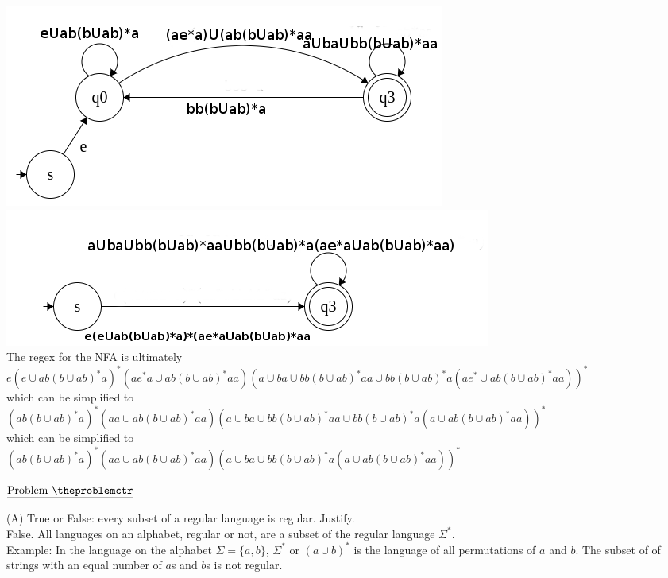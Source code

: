 \documentclass[11pt]{article}
\def\pp{\par\noindent}
\begin{document}
\includegraphics[scale=0.5]{4d.png}\\
\includegraphics[scale=0.5]{4e.png}\\
The regex for the NFA is ultimately \\$e(e\cup ab(b \cup ab)^*a)^*(ae^*a\cup ab(b \cup ab)^*aa)(a\cup ba\cup bb(b\cup ab)^*aa\cup bb(b\cup ab)^*a(ae^*\cup ab(b\cup ab)^*aa))^*$\\
which can be simplified to \\$(ab(b\cup ab)^*a)^*(aa\cup ab(b\cup ab)^*aa)(a\cup ba\cup bb(b\cup ab)^*aa\cup bb(b\cup ab)^*a(a\cup ab(b\cup ab)^*aa))^*$\\
which can be simplified to \\$(ab(b\cup ab)^*a)^*(aa\cup ab(b\cup ab)^*aa)(a\cup ba\cup bb(b\cup ab)^*a(a\cup ab(b\cup ab)^*aa))^*$

\begin{figure}[H]
\hspace{-0.0in}
\centering
\end{figure}

\addtocounter{problemctr}{1}
\noindent $\underline{\rm Problem\ \theproblemctr}$\pp

\noindent (A) True or False: every subset of a regular language is regular.
Justify.\\
False. All languages on an alphabet, regular or not, are a subset of the regular language $\Sigma^*$.\\
Example: In the language on the alphabet $\Sigma=\{a,b\}$, $\Sigma^*$ or $(a\cup b)^*$ is the language of all permutations of $a$ and $b$. The subset of of strings with an equal number of $a$s and $b$s is not regular.\\
\end{document}
